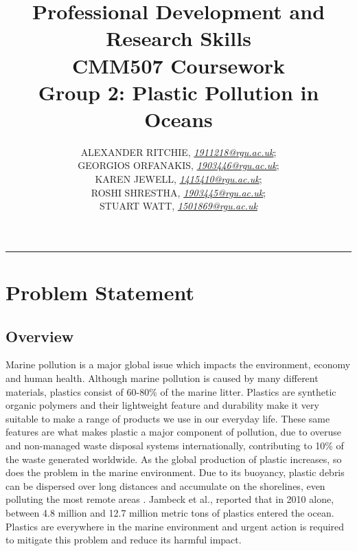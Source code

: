 \documentclass[10pt]{article}\usepackage[]{graphicx}\usepackage[]{color}
\begin{document}
\title{\LARGE Professional Development and Research Skills \\ CMM507 Coursework  \\ Group 2: Plastic Pollution in Oceans}

\author{ALEXANDER RITCHIE, \textit{\href{1911218@rgu.ac.uk}{1911218@rgu.ac.uk}};\\ GEORGIOS ORFANAKIS, \textit{\href{1903446@rgu.ac.uk}{1903446@rgu.ac.uk}};\\ KAREN JEWELL, \textit{\href{1415410@rgu.ac.uk}{1415410@rgu.ac.uk}};\\ ROSHI SHRESTHA, \textit{\href{1903445@rgu.ac.uk}{1903445@rgu.ac.uk}};\\ STUART WATT, \textit{\href{1501869@rgu.ac.uk}{1501869@rgu.ac.uk}}}

\maketitle
\noindent\rule{16cm}{0.4pt}


\section{Problem Statement}

\subsection{Overview}\label{over}

Marine pollution is a major global issue which impacts the environment, economy and human health. Although marine pollution is caused by many different materials, plastics consist of 60-80\% of the marine litter. \cite{DERRAIK2002} \cite{SMITH2013} \cite{KUO2014} \cite{ZHOU2011} \cite{JANG2014} Plastics are synthetic organic polymers and their lightweight feature and durability make it very suitable to make a range of products we use in our everyday life.\cite{BARNES2009} \cite{SIVAN2011} These same features are what makes plastic a major component of pollution, due to overuse and non-managed waste disposal systems internationally, contributing to 10\% of the waste generated worldwide.\cite{BARNES2009} As the global production of plastic increases, so does the problem in the marine environment. Due to its buoyancy, plastic debris can be dispersed over long distances and accumulate on the shorelines, even polluting the most remote areas \cite{LAVERS2017}. Jambeck et al.,\cite{JAMBECK2015} reported that in 2010 alone, between 4.8 million and 12.7 million metric tons of plastics entered the ocean. Plastics are everywhere in the marine environment and urgent action is required to mitigate this problem and reduce its harmful impact.\cite{RIOS2007} \cite{ROCHMAN2015} \\
\end{document}
